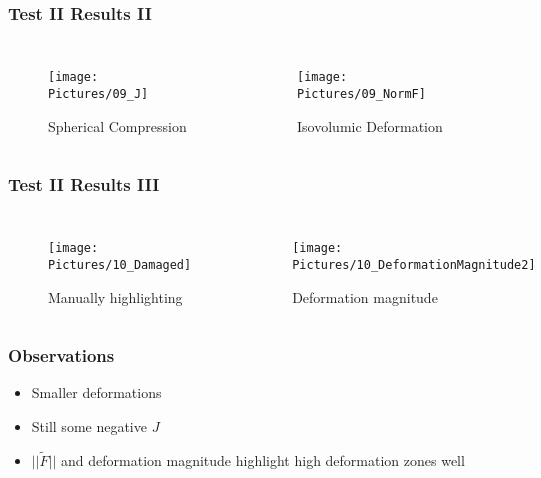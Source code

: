 \documentclass[xcolor=table]{beamer}
\begin{document}
\begin{frame}
	\frametitle{Test II Results II}
	\begin{columns}
		\centering
		\begin{figure}
			\texttt{[image: Pictures/09\_J]}
			\caption{Spherical Compression}
		\end{figure}
		\centering
		\begin{figure}
			\texttt{[image: Pictures/09\_NormF]}
			\caption{Isovolumic Deformation}
		\end{figure}
	\end{columns}
\end{frame}


\begin{frame}
	\frametitle{Test II Results III}
	\begin{columns}
		\column[c]{0.45\linewidth}
		\centering
		\begin{figure}
			\texttt{[image: Pictures/10\_Damaged]}
			\caption{Manually highlighting}
		\end{figure}
		\column[c]{0.45\linewidth}
		\centering
		\begin{figure}
			\texttt{[image: Pictures/10\_DeformationMagnitude2]}
			\caption{Deformation magnitude}
		\end{figure}
	\end{columns}
\end{frame}



\begin{frame}
	\frametitle{Observations}
	\begin{itemize}
		\item Smaller deformations
		\item Still some negative $J$
		\item $||\tilde{F}||$ and deformation magnitude highlight high deformation zones well
	\end{itemize}
\end{frame}


\appendix


\end{document}
